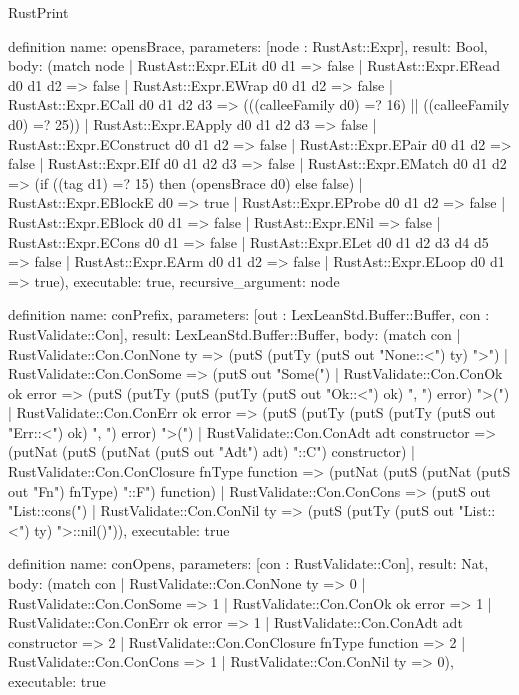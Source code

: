 \begin{lexlean}{RustPrint}
\begin{semanticmodule}
definition{
  name: opensBrace,
  parameters: [node : RustAst::Expr],
  result: Bool,
  body: (match node
    | RustAst::Expr.ELit d0 d1 => false
    | RustAst::Expr.ERead d0 d1 d2 => false
    | RustAst::Expr.EWrap d0 d1 d2 => false
    | RustAst::Expr.ECall d0 d1 d2 d3 => (((calleeFamily d0) =? 16) || ((calleeFamily d0) =? 25))
    | RustAst::Expr.EApply d0 d1 d2 d3 => false
    | RustAst::Expr.EConstruct d0 d1 d2 => false
    | RustAst::Expr.EPair d0 d1 d2 => false
    | RustAst::Expr.EIf d0 d1 d2 d3 => false
    | RustAst::Expr.EMatch d0 d1 d2 => (if ((tag d1) =? 15) then (opensBrace d0) else false)
    | RustAst::Expr.EBlockE d0 => true
    | RustAst::Expr.EProbe d0 d1 d2 => false
    | RustAst::Expr.EBlock d0 d1 => false
    | RustAst::Expr.ENil => false
    | RustAst::Expr.ECons d0 d1 => false
    | RustAst::Expr.ELet d0 d1 d2 d3 d4 d5 => false
    | RustAst::Expr.EArm d0 d1 d2 => false
    | RustAst::Expr.ELoop d0 d1 => true),
  executable: true,
  recursive_argument: node
}

definition{
  name: conPrefix,
  parameters: [out : LexLeanStd.Buffer::Buffer, con : RustValidate::Con],
  result: LexLeanStd.Buffer::Buffer,
  body: (match con
    | RustValidate::Con.ConNone ty => (putS (putTy (putS out "None::<") ty) ">")
    | RustValidate::Con.ConSome => (putS out "Some(")
    | RustValidate::Con.ConOk ok error => (putS (putTy (putS (putTy (putS out "Ok::<") ok) ", ") error) ">(")
    | RustValidate::Con.ConErr ok error => (putS (putTy (putS (putTy (putS out "Err::<") ok) ", ") error) ">(")
    | RustValidate::Con.ConAdt adt constructor => (putNat (putS (putNat (putS out "Adt") adt) "::C") constructor)
    | RustValidate::Con.ConClosure fnType function => (putNat (putS (putNat (putS out "Fn") fnType) "::F") function)
    | RustValidate::Con.ConCons => (putS out "List::cons(")
    | RustValidate::Con.ConNil ty => (putS (putTy (putS out "List::<") ty) ">::nil()")),
  executable: true
}

definition{
  name: conOpens,
  parameters: [con : RustValidate::Con],
  result: Nat,
  body: (match con
    | RustValidate::Con.ConNone ty => 0
    | RustValidate::Con.ConSome => 1
    | RustValidate::Con.ConOk ok error => 1
    | RustValidate::Con.ConErr ok error => 1
    | RustValidate::Con.ConAdt adt constructor => 2
    | RustValidate::Con.ConClosure fnType function => 2
    | RustValidate::Con.ConCons => 1
    | RustValidate::Con.ConNil ty => 0),
  executable: true
}


\end{semanticmodule}
\end{lexlean}
